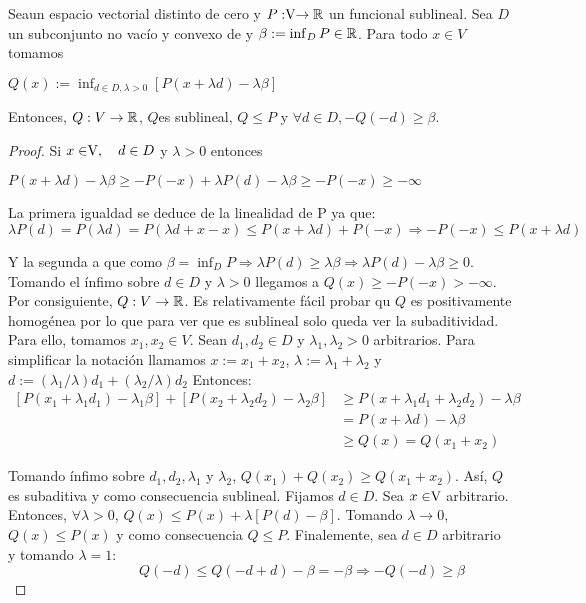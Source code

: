 	\begin{lemaBox}\label{lema2}
		Sea\vecSpace un espacio vectorial distinto de cero y $P:\vecSpace \rightarrow \RR$ un funcional sublineal. Sea $ D $ un subconjunto no vacío y convexo de \vecSpace y $ \beta := \inf_D P \in \mathbb{R} $. Para todo $ x \in V $ tomamos  
		\begin{center}
			$ Q(x) := \inf_{d \in D, \lambda > 0} \left[P(x+\lambda d) - \lambda \beta\right] $
		\end{center}
		
		Entonces, $ Q:V \rightarrow \mathbb{R}$, $ Q $es sublineal, $ Q \leq P $ y $ \forall d \in D, -Q(-d) \geq \beta$.
	\end{lemaBox} 
	\begin{proof}
		Si $ x \in \vecSpace, \quad d \in D $ y $ \lambda > 0 $ entonces
		\begin{center}
			$ P(x+ \lambda d) - \lambda \beta \geq -P(-x) + \lambda P(d)-\lambda\beta \geq -P(-x) \geq -\infty$
		\end{center}
		
		La primera igualdad se deduce de la linealidad de P ya que:
		\[ \lambda P(d) = P(\lambda d) =P(\lambda d +x-x) \leq P(x+\lambda d)+ P(-x) \Longrightarrow -P(-x) \leq P(x+\lambda d)\]
		
		Y la segunda a que como $ \beta = \inf_D P \Longrightarrow \lambda P(d) \geq \lambda\beta \Longrightarrow\lambda P(d) - \lambda\beta \geq 0 $. Tomando el ínfimo sobre $ d \in D  $ y $ \lambda > 0 $ llegamos a $ Q(x)\geq -P(-x) > -\infty$. Por consiguiente, $ Q:V \rightarrow \mathbb{R}$. Es relativamente fácil probar qu $ Q $ es positivamente homogénea por lo que para ver que es sublineal solo queda ver la subaditividad. Para ello, tomamos $ x_1, x_2 \in V $. Sean $ d_1, d_2 \in D $ y $ \lambda_1, \lambda_2 > 0$ arbitrarios. Para simplificar la notación llamamos $ x := x_1 + x_2 $, $ \lambda := \lambda_1 + \lambda_2 $ y $ d:= (\lambda_1/\lambda)d_1 + (\lambda_2/\lambda)d_2 $ Entonces: 
		\begin{equation*}
		\begin{split}
		\left[ P(x_1 + \lambda_1 d_1) - \lambda_1 \beta \right] + \left[ P(x_2 + \lambda_2 d_2) - \lambda_2 \beta \right] &\geq P(x + \lambda_1 d_1 + \lambda_2 d_2) - \lambda \beta\\
		& = P(x +\lambda d) - \lambda \beta\\ 
		& \geq Q(x) = Q(x_1 + x_2)
		\end{split}
		\end{equation*}
		
		Tomando ínfimo sobre $ d_1, d_2, \lambda_1 $ y $ \lambda_2 $, $  Q(x_1) + Q (x_2 ) \geq Q (x_1 + x_2 ) $. Así, $ Q $ es subaditiva y como consecuencia sublineal. Fijamos $ d \in D $. Sea $ x \in \vecSpace $ arbitrario. Entonces, $ \forall \lambda > 0 $, $ Q(x) \leq P(x) + \lambda \left[P(d) - \beta \right]$. Tomando $ \lambda \longrightarrow 0 $, $ Q(x) \leq P(x)$ y como consecuencia $ Q \leq P $. Finalemente, sea $ d \in D $ arbitrario y tomando $ \lambda = 1 $:
		\[ \qquad \qquad \qquad Q(-d) \leq Q(-d+d) - \beta = -\beta \Longrightarrow  -Q(-d) \geq \beta  \]
		
	\end{proof}
	
